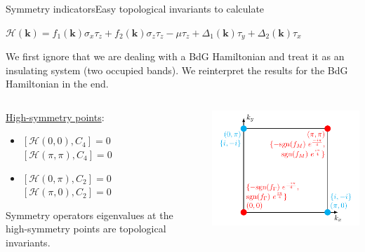 \documentclass{beamer}
\newcommand{\mc}{\mathcal}
\renewcommand{\(}{\left(}
\renewcommand{\)}{\right)}
\renewcommand{\[}{\left[}
\renewcommand{\]}{\right]}
\begin{document}
\begin{frame}{Symmetry indicators}{Easy topological invariants 
    to calculate}
    \begin{center}
        $\mc H(\bm k) = f_1(\bm k) \sigma_x \tau_z + f_2(\bm k) \sigma_z \tau_z -\mu \tau_z + \Delta_1(\bm k) \tau_y + \Delta_2(\bm k) \tau_x$
    \end{center}
    \begin{framed}
        We first ignore that we are dealing with a BdG Hamiltonian and treat it as an insulating system (two occupied bands). We reinterpret the results for the BdG Hamiltonian in the end.  
    \end{framed}
    \pause
   \begin{columns}
       \begin{column}{0.5\textwidth}
            \underline{High-symmetry points}: 
            \begin{itemize}
                \item $[\mc H(0,0), C_4] = 0$ \\ $ [\mc H(\pi,\pi), C_4] = 0$\vspace{5pt}
                \item $[\mc H(0,\pi), C_2] = 0$ \\ $[\mc H(\pi,0), C_2] = 0$
            \end{itemize}\pause
            Symmetry operators eigenvalues at the high-symmetry points are topological invariants.
        \end{column}
       \begin{column}{0.5\textwidth}
        \centering
        \includegraphics[scale = 0.75]{super_4_wannier_rep.pdf}

       \end{column}
   \end{columns}
\end{frame}
\end{document}
